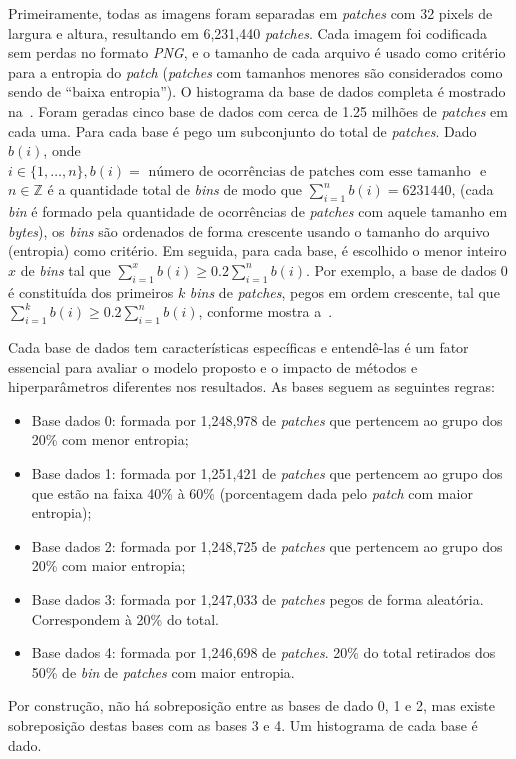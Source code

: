 Primeiramente, todas as imagens foram separadas em \textit{patches} com 32 pixels de largura e altura, resultando em 6,231,440 \textit{patches}. Cada imagem foi codificada sem perdas no formato \textit{PNG}, e o tamanho de cada arquivo é usado como critério para a entropia do \textit{patch} (\textit{patches} com tamanhos menores são considerados como sendo de ``baixa entropia''). O histograma da base de dados completa é mostrado na~.
Foram geradas cinco base de dados com cerca de 1.25 milhões de \textit{patches} em cada uma. Para cada base é pego um subconjunto do total de \textit{patches}. Dado $b(i)$, onde $i \in \{1,\dots,n\}, b(i) = \text{ número de ocorrências de patches com esse tamanho }$ e $n \in \mathbb{Z}$ é a quantidade total de \textit{bins} de modo que $\sum_{i=1}^{n}b(i) = 6231440$, (cada \textit{bin} é formado pela quantidade de ocorrências de \textit{patches} com aquele tamanho em \textit{bytes}), os \textit{bins} são ordenados de forma crescente usando o tamanho do arquivo (entropia) como critério. Em seguida, para cada base, é escolhido o menor inteiro $x$ de \textit{bins} tal que $\sum_{i=1}^{x}b(i) \geq 0.2\sum_{i=1}^{n}b(i)$. Por exemplo, a base de dados 0 é constituída dos primeiros $k$ \textit{bins} de \textit{patches}, pegos em ordem crescente, tal que $\sum_{i=1}^{k}b(i) \geq 0.2\sum_{i=1}^{n}b(i)$, conforme mostra a~.

Cada base de dados tem características específicas e entendê-las é um fator essencial para avaliar o modelo proposto e o impacto de métodos e hiperparâmetros diferentes nos resultados. As bases seguem as seguintes regras:
\begin{itemize}
    \item Base dados 0: formada por 1,248,978 de \textit{patches} que pertencem ao grupo dos 20\% com menor entropia;
    \item Base dados 1: formada por 1,251,421 de \textit{patches} que pertencem ao grupo dos que estão na faixa 40\% à 60\% (porcentagem dada pelo \textit{patch} com maior entropia);
    \item Base dados 2: formada por 1,248,725 de \textit{patches} que pertencem ao grupo dos 20\% com maior entropia;
    \item Base dados 3: formada por 1,247,033 de \textit{patches} pegos de forma aleatória. Correspondem à 20\% do total.
    \item Base dados 4: formada por 1,246,698 de \textit{patches}. 20\% do total retirados dos 50\% de \textit{bin} de \textit{patches} com maior entropia.
\end{itemize}
Por construção, não há sobreposição entre as bases de dado 0, 1 e 2, mas existe sobreposição destas bases com as bases 3 e 4. Um histograma de cada base é dado.
